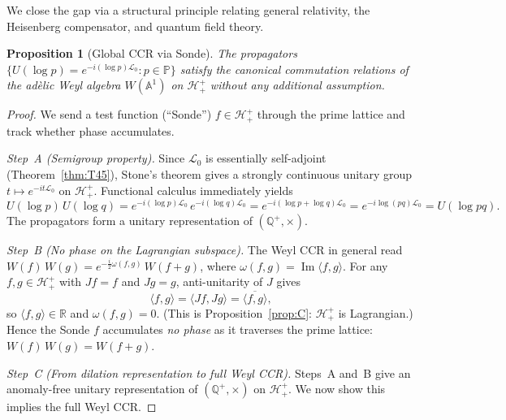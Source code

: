 \documentclass[12pt,a4paper]{article}
\newtheorem{proposition}[theorem]{Proposition}
\theoremstyle{remark}
\begin{document}
We close the gap via a structural principle relating general relativity,
the Heisenberg compensator, and quantum field theory.

\begin{proposition}[Global CCR via Sonde]\label{prop:CCR}
The propagators $\{U(\log p) = e^{-i(\log p)\mathcal{L}_0} : p\in\mathbb{P}\}$
satisfy the canonical commutation relations of the adèlic Weyl algebra
$W(\mathbb{A}^1)$ on $\mathcal{H}^+_+$ without any additional assumption.
\end{proposition}
\begin{proof}
We send a test function (``Sonde'') $f\in\mathcal{H}^+_+$ through the
prime lattice and track whether phase accumulates.

\emph{Step~A (Semigroup property).}
Since $\mathcal{L}_0$ is essentially self-adjoint
(Theorem~\ref{thm:T45}), Stone's theorem gives a strongly continuous
unitary group $t\mapsto e^{-it\mathcal{L}_0}$ on $\mathcal{H}^+_+$.
Functional calculus immediately yields
\[
  U(\log p)\,U(\log q)
  = e^{-i(\log p)\mathcal{L}_0}\,e^{-i(\log q)\mathcal{L}_0}
  = e^{-i(\log p+\log q)\mathcal{L}_0}
  = e^{-i\log(pq)\mathcal{L}_0}
  = U(\log pq).
\]
The propagators form a unitary representation of $(\mathbb{Q}^+,\times)$.

\emph{Step~B (No phase on the Lagrangian subspace).}
The Weyl CCR in general read
$W(f)\,W(g) = e^{-\frac{i}{2}\omega(f,g)}\,W(f+g)$,
where $\omega(f,g) = \operatorname{Im}\langle f,g\rangle$.
For any $f,g\in\mathcal{H}^+_+$ with $Jf=f$ and $Jg=g$, anti-unitarity
of $J$ gives
\[
  \langle f,g\rangle
  = \langle Jf,Jg\rangle
  = \overline{\langle f,g\rangle},
\]
so $\langle f,g\rangle\in\mathbb{R}$ and $\omega(f,g)=0$.
(This is Proposition~\ref{prop:C}: $\mathcal{H}^+_+$ is Lagrangian.)
Hence the Sonde $f$ accumulates \emph{no phase} as it traverses the
prime lattice: $W(f)\,W(g) = W(f+g)$.

\emph{Step~C (From dilation representation to full Weyl CCR).}
Steps~A and~B give an anomaly-free unitary representation of
$(\mathbb{Q}^+,\times)$ on $\mathcal{H}^+_+$.
We now show this implies the full Weyl CCR.


\end{proof}
\end{document}
